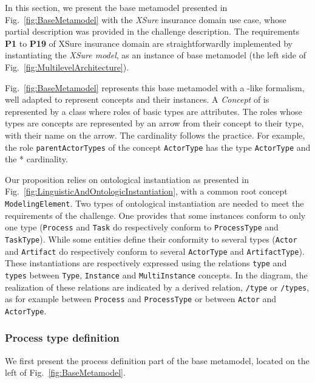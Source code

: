 In this section, we present the base metamodel presented in
Fig.~\ref{fig:BaseMetamodel} with the \textit{XSure} insurance domain use case,
whose partial description was provided in the challenge description. The
requirements \textbf{P1} to \textbf{P19} of XSure insurance domain are
straightforwardly implemented by instantiating the \emph{XSure model}, as an
instance of base metamodel (the left side of
Fig.~\ref{fig:MultilevelArchitecture}).

Fig.~\ref{fig:BaseMetamodel} represents this base metamodel with a \UML-like
formalism, well adapted to represent \FML concepts and their instances. A
\textit{Concept} of \FML is represented by a \UML class where roles of basic
types are attributes. The roles whose types are concepts are represented by an
arrow from their concept to their type, with their name on the arrow. The
cardinality follows the \UML practice.  For example, the role
\texttt{parentActorTypes} of the concept \texttt{ActorType} has the type
\texttt{ActorType} and the * cardinality.

Our proposition relies on ontological instantiation as presented in
Fig.~\ref{fig:LinguisticAndOntologicInstantiation}, with a common root concept
\texttt{ModelingElement}. Two types of ontological instantiation are needed to
meet the requirements of the challenge. One provides that some instances
conform to only one type (\texttt{Process} and \texttt{Task} do respectively
conform to \texttt{ProcessType} and \texttt{TaskType}). While some entities
define their conformity to several types (\texttt{Actor} and \texttt{Artifact}
do respectively conform to several \texttt{ActorType} and
\texttt{ArtifactType}). These instantiations are respectively expressed using
the relations \texttt{type} and \texttt{types} between \texttt{Type},
\texttt{Instance} and \texttt{MultiInstance} concepts. In the diagram, the
realization of these relations are indicated by a derived relation,
\texttt{/type} or \texttt{/types}, as for example between \texttt{Process} and
\texttt{ProcessType} or between \texttt{Actor} and \texttt{ActorType}.

\subsubsection{Process type definition}

We first present the process definition part of the base metamodel, located on
the left of Fig.~\ref{fig:BaseMetamodel}.


